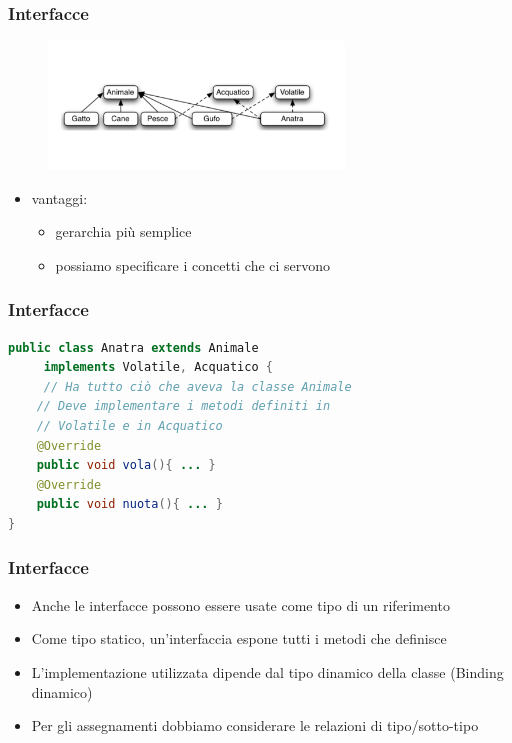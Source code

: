 \documentclass{beamer}
\begin{document}
\begin{frame}[fragile]
\frametitle{Interfacce}
\begin{figure}[h!]
  \centering
    \includegraphics[width=0.7\textwidth]{gerarchia4.pdf}
\end{figure}
\begin{itemize}
\item vantaggi:
\begin{itemize}
\item gerarchia pi\`u semplice
\item possiamo specificare i concetti che ci servono
\end{itemize}
\end{itemize}
\end{frame}

\begin{frame}[fragile]
\frametitle{Interfacce}
\begin{lstlisting}[language=Java,escapechar=|]
public class Anatra extends Animale
     implements Volatile, Acquatico { 
     // Ha tutto ciò che aveva la classe Animale
    // Deve implementare i metodi definiti in 
    // Volatile e in Acquatico 
    @Override
    public void vola(){ ... }
    @Override    
    public void nuota(){ ... } 
}
\end{lstlisting}
\end{frame}

\begin{frame}[fragile]
\frametitle{Interfacce}
 \begin{itemize}
 \item Anche le interfacce possono essere usate come tipo di un riferimento
 \item Come tipo statico, un'interfaccia espone tutti i metodi che definisce
 \item L'implementazione utilizzata dipende dal tipo dinamico della classe (Binding dinamico)
 \item Per gli assegnamenti dobbiamo considerare le relazioni di tipo/sotto-tipo
 \end{itemize}
\end{frame}
\end{document}
